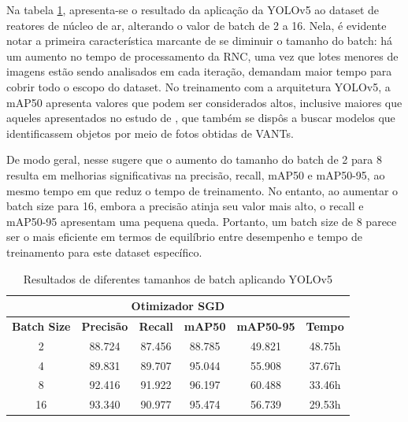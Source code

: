 Na tabela \ref{tab:yolov5-teste}, apresenta-se o resultado da aplicação da YOLOv5 ao dataset de reatores de núcleo de ar, alterando o valor de batch de 2 a 16. Nela, é evidente notar a primeira característica marcante de se diminuir o tamanho do batch: há um aumento no tempo de processamento da RNC, uma vez que lotes menores de imagens estão sendo analisados em cada iteração, demandam maior tempo para cobrir todo o escopo do dataset. No treinamento com a arquitetura YOLOv5, a mAP50 apresenta valores que podem ser considerados altos, inclusive maiores que aqueles apresentados no estudo de \cite{wang2023uav}, que também se dispôs a buscar modelos que identificassem objetos por meio de fotos obtidas de VANTs.

De modo geral, nesse sugere que o aumento do tamanho do batch de 2 para 8 resulta em melhorias significativas na precisão, recall, mAP50 e mAP50-95, ao mesmo tempo em que reduz o tempo de treinamento. No entanto, ao aumentar o batch size para 16, embora a precisão atinja seu valor mais alto, o recall e mAP50-95 apresentam uma pequena queda. Portanto, um batch size de 8 parece ser o mais eficiente em termos de equilíbrio entre desempenho e tempo de treinamento para este dataset específico.

\begin{table}[!hbt]
    \centering
    \begin{tabular}{|c|c|c|c|c|c|}
    \hline
    \multicolumn{6}{|c|}{\textbf{Otimizador SGD}} \\ \hline
    \textbf{Batch Size} & \textbf{Precisão} & \textbf{Recall} & \textbf{mAP50} & \textbf{mAP50-95} & \textbf{Tempo} \\ \hline
    2                   & 88.724                & 87.456               & 88.785              & 49.821                 & 48.75h             \\ \hline
    4                   & 89.831                 & 89.707               & 95.044             & 55.908                & 37.67h             \\ \hline
    8                   & 92.416                 & 91.922               & 96.197              & 60.488                 & 33.46h             \\ \hline
    16                  & 93.340                 & 90.977               & 95.474              & 56.739                 & 29.53h             \\ \hline
    \end{tabular}
    \caption{Resultados de diferentes tamanhos de batch aplicando YOLOv5}
    \label{tab:yolov5-teste}
\end{table}

